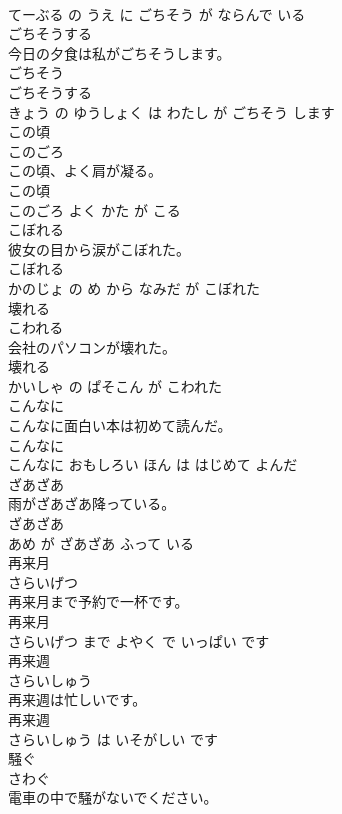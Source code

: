\documentclass[8pt]{extreport}
\begin{document}
\begin{CJK}{UTF8}{min}
\\	てーぶる の うえ に ごちそう が ならんで いる			
\\	ごちそうする	
\\	今日の夕食は私がごちそうします。	
\\	ごちそう 
\\	ごちそうする 
\\	きょう の ゆうしょく は わたし が ごちそう します			
\\	この頃	
\\	このごろ			
\\	この頃、よく肩が凝る。	
\\	この頃 
\\	このごろ よく かた が こる			
\\	こぼれる	
\\	彼女の目から涙がこぼれた。	
\\	こぼれる 
\\	かのじょ の め から なみだ が こぼれた			
\\	壊れる	
\\	こわれる			
\\	会社のパソコンが壊れた。	
\\	壊れる 
\\	かいしゃ の ぱそこん が こわれた			
\\	こんなに	
\\	こんなに面白い本は初めて読んだ。	
\\	こんなに 
\\	こんなに おもしろい ほん は はじめて よんだ			
\\	ざあざあ	
\\	雨がざあざあ降っている。	
\\	ざあざあ 
\\	あめ が ざあざあ ふって いる			
\\	再来月	
\\	さらいげつ			
\\	再来月まで予約で一杯です。	
\\	再来月 
\\	さらいげつ まで よやく で いっぱい です			
\\	再来週	
\\	さらいしゅう			
\\	再来週は忙しいです。	
\\	再来週 
\\	さらいしゅう は いそがしい です			
\\	騒ぐ	
\\	さわぐ			
\\	電車の中で騒がないでください。	

\end{CJK}
\end{document}
